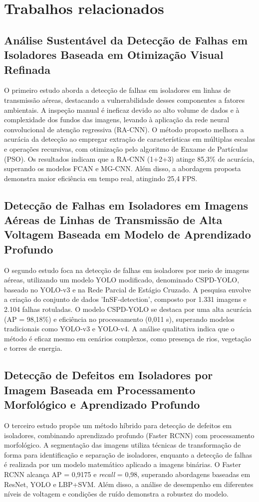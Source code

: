 \chapter{Trabalhos relacionados}

\section{Análise Sustentável da Detecção de Falhas em Isoladores Baseada em Otimização Visual Refinada}
O primeiro estudo aborda a detecção de falhas em isoladores em linhas de transmissão aéreas, destacando a vulnerabilidade desses componentes a fatores ambientais. A inspeção manual é ineficaz devido ao alto volume de dados e à complexidade dos fundos das imagens, levando à aplicação da rede neural convolucional de atenção regressiva (RA-CNN). O método proposto melhora a acurácia da detecção ao empregar extração de características em múltiplas escalas e operações recursivas, com otimização pelo algoritmo de Enxame de Partículas (PSO). Os resultados indicam que a RA-CNN (1+2+3) atinge 85,3\% de acurácia, superando os modelos FCAN e MG-CNN. Além disso, a abordagem proposta demonstra maior eficiência em tempo real, atingindo 25,4 FPS. \cite{wang2023}

\section{Detecção de Falhas em Isoladores em Imagens Aéreas de Linhas de Transmissão de Alta Voltagem Baseada em Modelo de Aprendizado Profundo}
O segundo estudo foca na detecção de falhas em isoladores por meio de imagens aéreas, utilizando um modelo YOLO modificado, denominado CSPD-YOLO, baseado no YOLO-v3 e na Rede Parcial de Estágio Cruzado. A pesquisa envolve a criação do conjunto de dados 'InSF-detection', composto por 1.331 imagens e 2.104 falhas rotuladas. O modelo CSPD-YOLO se destaca por uma alta acurácia (AP = 98,18\%) e eficiência no processamento (0,011 s), superando modelos tradicionais como YOLO-v3 e YOLO-v4. A análise qualitativa indica que o método é eficaz mesmo em cenários complexos, como presença de rios, vegetação e torres de energia. \cite{liu2021}

\section{Detecção de Defeitos em Isoladores por Imagem Baseada em Processamento Morfológico e Aprendizado Profundo}
O terceiro estudo propõe um método híbrido para detecção de defeitos em isoladores, combinando aprendizado profundo (Faster RCNN) com processamento morfológico. A segmentação das imagens utiliza técnicas de transformação de forma para identificação e separação de isoladores, enquanto a detecção de falhas é realizada por um modelo matemático aplicado a imagens binárias. O Faster RCNN alcança AP = 0,9175 e \textit{recall} = 0,98, superando abordagens baseadas em ResNet, YOLO e LBP+SVM. Além disso, a análise de desempenho em diferentes níveis de voltagem e condições de ruído demonstra a robustez do modelo. \cite{zhang2022}


